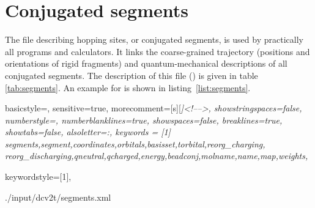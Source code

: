\section{Conjugated segments}
\label{sec:xmlsegments}
The file describing hopping sites, or conjugated segments, is used by 
practically all programs and calculators. It links the coarse-grained trajectory 
(positions and orientations of rigid fragments) and quantum-mechanical 
descriptions of all conjugated segments. The description of this \xml file 
(\xmlmap) is given in table \ref{tab:segments}. An example for is 
shown in listing~\ref{list:segments}.
%
\begin{table}[h]
\label{tab:segments}
 {\footnotesize 
 }
\end{table}
%
 {
   basicstyle=\ttfamily\scriptsize,
   sensitive=true,
   morecomment=[s][\color{gray}\rmfamily\itshape]{<!--}{-->}, 
   showstringspaces=false,
   numberstyle=\scriptsize,
   numberblanklines=true,
   showspaces=false,
   breaklines=true,
   showtabs=false,
   alsoletter={:},
   keywords = [1]
{segments,segment,coordinates,orbitals,basisset,torbital,reorg_charging,
reorg_discharging,qneutral,qcharged,energy,beadconj,molname,name,map,weights},  
 
  keywordstyle={[1]\color{blue}},
}
%
%
{./input/dcv2t/segments.xml}


